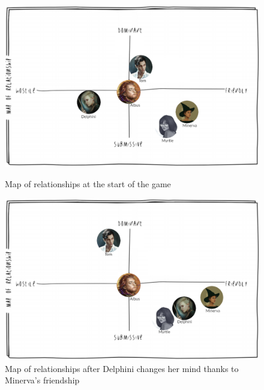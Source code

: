 \begin{figure}[H]
\includegraphics[max width=\textwidth]{../Pictures/Characters/Relationship_maps/Albus_relmap.png} 
\captionsetup{labelformat=empty}
\caption{Map of relationships at the start of the game}
\includegraphics[max width=\textwidth]{../Pictures/Characters/Relationship_maps/Albus_after_event_relmap.png} 
\captionsetup{labelformat=empty}
\caption{Map of relationships after Delphini changes her mind thanks to Minerva's friendship}
\end{figure}


\clearpage
